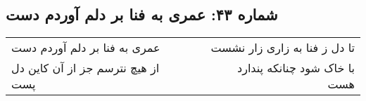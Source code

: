 \begin{center}
\section*{شماره ۴۳: عمری به فنا بر دلم آوردم دست}
\label{sec:043}
\begin{longtable}{l p{0.5cm} r}
عمری به فنا بر دلم آوردم دست
&&
تا دل ز فنا به زاری زار نشست
\\
از هیچ نترسم جز از آن کاین دل پست
&&
با خاک شود چنانکه پندارد هست
\\
\end{longtable}
\end{center}
